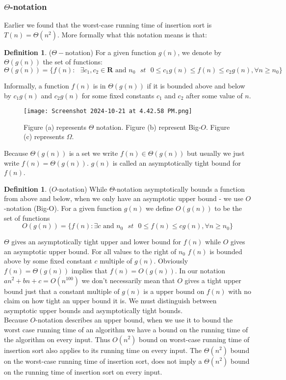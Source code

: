 \documentclass{scrartcl}
\newcommand{\BR}{\mathbf{R}}
\theoremstyle{definition}
\theoremstyle{definition}
\newtheorem{definition}[theorem]{Definition}
\theoremstyle{remark}
\numberwithin{equation}{section}
\begin{document}
\subsubsection{$\Theta$-notation}
Earlier we found that the worst-case running time of insertion sort is $T(n)=\Theta(n^2)$. More formally what this notation means is that:\\
\begin{definition} ($\Theta-$notation) 
    For a given function $g(n)$, we denote by $\Theta(g(n))$ the set of functions: \\
    $$\Theta(g(n))=\{f(n):\text{ }\exists c_1,c_2\in\BR\text{ and }n_0\text{ }st\text{ }0\leq c_1 g(n)\leq f(n)\leq c_2g(n),\forall n\geq n_0\}$$
\end{definition}
Informally, a function $f(n)$ is in $\Theta(g(n))$ if it is bounded above and below by $c_1g(n)$ and $c_2g(n)$ for some fixed constants $c_1$ and $c_2$ after some value of $n$.
\begin{figure}[h]
\centering
\texttt{[image: Screenshot 2024-10-21 at 4.42.58 PM.png]}
\caption{Figure (a) represents $\Theta$ notation. Figure (b) represent Big-$O$. Figure (c) represents $\Omega$.}
\end{figure}
Because $\Theta(g(n))$ is a set we write $f(n)\in\Theta(g(n))$ but usually we just write $f(n)=\Theta(g(n))$. $g(n)$ is called an asymptotically tight bound for $f(n)$.\\
\begin{definition}($O$-notation)
    While $\Theta$-notation asymptotically bounds a function from above and below, when we only have an asymptotic upper bound - we use $O$-notation (Big-O). For a given function $g(n)$ we define $O(g(n))$ to be the set of functions
    $$O(g(n))=\{f(n):\exists c\text{ and }n_0\text{ }st\text{ }0\leq f(n)\leq cg(n),\forall n\geq n_0 \}$$
\end{definition}
$\Theta$ gives an asymptotically tight upper and lower bound for $f(n)$ while $O$ gives an asymptotic upper bound. For all values to the right of $n_0$ $f(n)$ is bounded above by some fixed constant $c$ multiple of $g(n)$. Obviously $f(n)=\Theta(g(n))$ implies that $f(n)=O(g(n))$. In our notation $an^2+bn+c=O(n^{100})$ we don't necessarily mean that $O$ gives a tight upper bound just that a constant multiple of $g(n)$ is a upper bound on $f(n)$ with no claim on how tight an upper bound it is. We must distinguish between asymptotic upper bounds and asymptotically tight bounds.  \\
Because $O$-notation describes an upper bound, when we use it to bound the worst case running time of an algorithm we have a bound on the running time of the algorithm on every input. Thus $O(n^2)$ bound on worst-case running time of insertion sort also applies to its running time on every input. The $\Theta(n^2)$ bound on the worst-case running time of insertion sort, does not imply a $\Theta(n^2)$ bound on the running time of insertion sort on every input.\\
\end{document}
